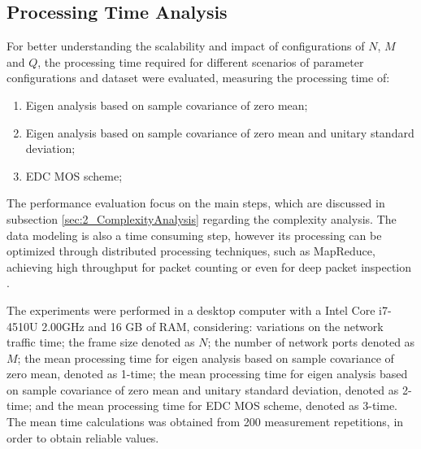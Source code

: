 \subsection{Processing Time Analysis}
\label{sec:2_ProcessingAnalysis}
For better understanding the scalability and impact of configurations of $N$, $M$ and $Q$, the processing time required for different scenarios of parameter configurations and dataset were evaluated, measuring the processing time of: 

\begin{enumerate}
	\item Eigen analysis based on sample covariance of zero mean;
	\item Eigen analysis based on sample covariance of zero mean and unitary standard deviation;
	\item EDC MOS scheme;
\end{enumerate}

The performance evaluation focus on the main steps, which are discussed in subsection \ref{sec:2_ComplexityAnalysis} regarding the complexity analysis. The data modeling is also a time consuming step, however its processing can be optimized through distributed processing techniques, such as MapReduce, achieving high throughput for packet counting or even for deep packet inspection \cite{Vieira2013}.

The experiments were performed in a desktop computer with a Intel Core i7-4510U 2.00GHz and 16 GB of RAM, considering: variations on the network traffic time; the frame size denoted as $N$; the number of network ports denoted as $M$; the mean processing time for eigen analysis based on sample covariance of zero mean, denoted as 1-time; the mean processing time for eigen analysis based on sample covariance of zero mean and unitary standard deviation, denoted as 2-time; and the mean processing time for EDC MOS scheme, denoted as 3-time. The mean time calculations was obtained from 200 measurement repetitions, in order to obtain reliable values.

